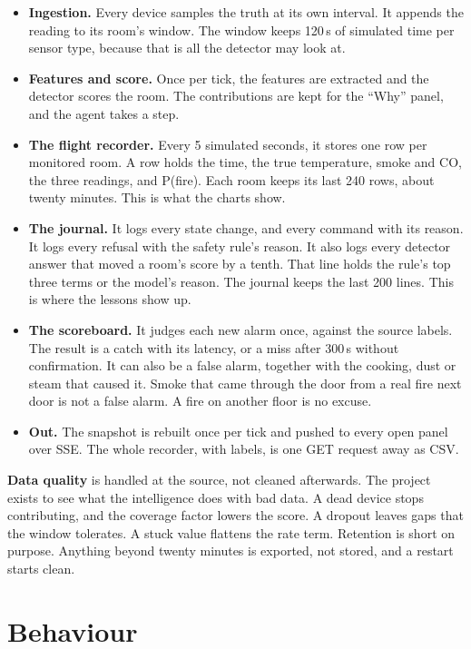 \begin{itemize}[leftmargin=1.4em, itemsep=2pt]
\item \textbf{Ingestion.} Every device samples the truth at its own interval. It
  appends the reading to its room's window. The window keeps 120\,s of simulated
  time per sensor type, because that is all the detector may look at.
\item \textbf{Features and score.} Once per tick, the features are extracted and
  the detector scores the room. The contributions are kept for the ``Why'' panel,
  and the agent takes a step.
\item \textbf{The flight recorder.} Every 5 simulated seconds, it stores one row
  per monitored room. A row holds the time, the true temperature, smoke and CO, the
  three readings, and P(fire). Each room keeps its last 240 rows, about twenty
  minutes. This is what the charts show.
\item \textbf{The journal.} It logs every state change, and every command with its
  reason. It logs every refusal with the safety rule's reason. It also logs every
  detector answer that moved a room's score by a tenth. That line holds the rule's
  top three terms or the model's reason. The journal keeps the last 200 lines. This
  is where the lessons show up.
\item \textbf{The scoreboard.} It judges each new alarm once, against the source
  labels. The result is a catch with its latency, or a miss after 300\,s without
  confirmation. It can also be a false alarm, together with the cooking, dust or
  steam that caused it. Smoke that came through the door from a real fire next door
  is not a false alarm. A fire on another floor is no excuse.
\item \textbf{Out.} The snapshot is rebuilt once per tick and pushed to every open
  panel over SSE. The whole recorder, with labels, is one GET request away as CSV.
\end{itemize}

\textbf{Data quality} is handled at the source, not cleaned afterwards. The
project exists to see what the intelligence does with bad data. A dead device stops
contributing, and the coverage factor lowers the score. A dropout leaves gaps that
the window tolerates. A stuck value flattens the rate term. Retention is short on
purpose. Anything beyond twenty minutes is exported, not stored, and a restart
starts clean.

\section{Behaviour}\label{sec:behaviour}

